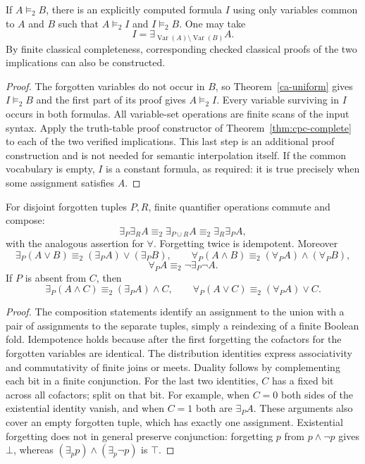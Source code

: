 \begin{corollary}\label{ca-craig}
If $A\models_2 B$, there is an explicitly computed formula $I$ using only
variables common to $A$ and $B$ such that
$A\models_2 I$ and $I\models_2 B$.  One may take
\[
 I=\exists_{\operatorname{Var}(A)\setminus\operatorname{Var}(B)} A.
\]
By finite classical completeness, corresponding checked classical proofs of
the two implications can also be constructed.
\end{corollary}
\begin{proof}
The forgotten variables do not occur in $B$, so
Theorem~\ref{ca-uniform} gives $I\models_2 B$ and the first part of its
proof gives $A\models_2 I$.  Every variable surviving in $I$ occurs in both
formulas.  All variable-set operations are finite scans of the input syntax.
Apply the truth-table proof constructor of Theorem~\ref{thm:cpc-complete} to each
of the two verified implications.  This last step is an additional proof
construction and is not needed for semantic interpolation itself.
If the common vocabulary is empty, $I$ is a constant formula, as required:
it is true precisely when some assignment satisfies $A$.
\end{proof}

\begin{proposition}\label{ca-forgetting-laws}
For disjoint forgotten tuples $P,R$, finite quantifier operations commute
and compose:
\[
 \exists_P\exists_R A\equiv_2\exists_{P\cup R}A
 \equiv_2\exists_R\exists_P A,
\]
with the analogous assertion for $\forall$.  Forgetting twice is idempotent.
Moreover
\[
 \exists_P(A\vee B)\equiv_2(\exists_PA)\vee(\exists_PB),\qquad
 \forall_P(A\wedge B)\equiv_2(\forall_PA)\wedge(\forall_PB),
\]
\[
 \forall_P A\equiv_2\neg\exists_P\neg A.
\]
If $P$ is absent from $C$, then
\[
 \exists_P(A\wedge C)\equiv_2(\exists_PA)\wedge C,
 \qquad
 \forall_P(A\vee C)\equiv_2(\forall_PA)\vee C.
\]
\end{proposition}
\begin{proof}
The composition statements identify an assignment to the union with a pair
of assignments to the separate tuples, simply a reindexing of a finite
Boolean fold.  Idempotence holds because after the first forgetting the
cofactors for the forgotten variables are identical.  The distribution
identities express associativity and commutativity of finite joins or meets.
Duality follows by complementing each bit in a finite conjunction.  For the
last two identities, $C$ has a fixed bit across all cofactors; split on that
bit.  For example, when $C=0$ both sides of the existential identity vanish,
and when $C=1$ both are $\exists_PA$.  These arguments also cover an empty
forgotten tuple, which has exactly one assignment.  Existential forgetting
does not in general preserve conjunction: forgetting $p$ from $p\wedge\neg p$
gives $\bot$, whereas $(\exists_p p)\wedge(\exists_p\neg p)$ is $\top$.
\end{proof}

